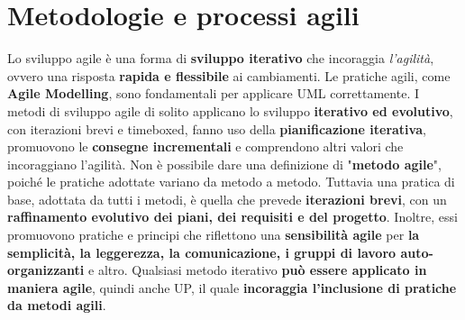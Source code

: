 \documentclass[12pt]{article}
\begin{document}
\section{Metodologie e processi agili}
Lo sviluppo agile è una forma di \textbf{sviluppo iterativo} che incoraggia \textit{l'agilità}, ovvero una risposta \textbf{rapida e flessibile} ai cambiamenti.
Le pratiche agili, come \textbf{Agile Modelling}, sono fondamentali per applicare UML correttamente.
I metodi di sviluppo agile di solito applicano lo sviluppo \textbf{iterativo ed evolutivo}, con iterazioni brevi e timeboxed, fanno uso della \textbf{pianificazione iterativa}, promuovono le \textbf{consegne incrementali} e comprendono altri valori che incoraggiano l'agilità.
Non è possibile dare una definizione di "\textbf{metodo agile}", poiché le pratiche adottate variano da metodo a metodo. Tuttavia una pratica di base, adottata da tutti i metodi, è quella che prevede \textbf{iterazioni brevi}, con un \textbf{raffinamento evolutivo dei piani, dei requisiti e del progetto}.
Inoltre, essi promuovono pratiche e principi che riflettono una \textbf{sensibilità agile} per \textbf{la semplicità, la leggerezza, la comunicazione, i gruppi di lavoro auto-organizzanti} e altro.
Qualsiasi metodo iterativo \textbf{può essere applicato in maniera agile}, quindi anche UP, il quale \textbf{incoraggia l'inclusione di pratiche da metodi agili}.
\end{document}
